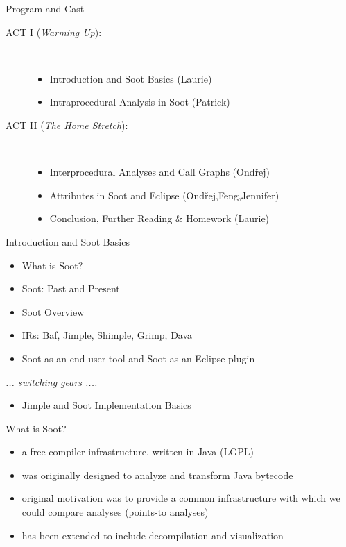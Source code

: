 \begin{slide}{Program and Cast}
\begin{description}
\item[ACT I ({\em Warming Up}):] \hspace{1in} \\
\begin{itemize}
\item Introduction and Soot Basics {\blue (Laurie)}
\item Intraprocedural Analysis in Soot {\blue (Patrick)}
\end{itemize}
\item[ACT II ({\em The Home Stretch}):] \hspace{1in} \\
\begin{itemize}
\item Interprocedural Analyses and Call Graphs {\blue (Ond\v{r}ej)}
\item Attributes in Soot and Eclipse {\blue (Ond\v{r}ej,Feng,Jennifer)}
\item Conclusion, Further Reading \& Homework {\blue (Laurie)}
\end{itemize}
\end{description}
\end{slide}

\begin{slide}{Introduction and Soot Basics}
\begin{itemize}
\item What is Soot?
\item Soot: Past and Present
\item Soot Overview
\item IRs: Baf, {\red Jimple}, Shimple, Grimp, Dava
\item Soot as an end-user tool and Soot as an Eclipse plugin
\end{itemize}
\begin{center}
\textit{ ... switching gears .... }
\end{center}
\begin{itemize}
\item Jimple and Soot Implementation Basics 
\end{itemize}
\end{slide}

\begin{slide}{What is Soot?}
\begin{itemize}
\item a free compiler infrastructure, written in Java (LGPL)
\item was originally designed to analyze and transform Java bytecode
\item original motivation was to provide a common infrastructure with
which we could compare analyses (points-to analyses)
\item has been extended to include decompilation and visualization
\end{itemize}
\end{slide}

